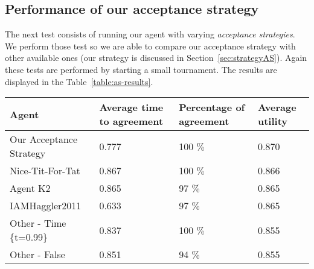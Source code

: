 \subsection{Performance of our acceptance strategy}

The next test consists of running our agent with varying \emph{acceptance strategies}. We perform those test so we are able to compare our acceptance strategy with other available ones (our strategy is discussed in Section~\ref{sec:strategyAS}). Again these tests are performed by starting a small tournament. The results are displayed in the Table~\ref{table:as-results}. 

\begin{table}[H]
	\centering
	\small
\begin{tabular}{m{4.0cm}m{3.0cm}m{3.0cm}m{3.0cm}}
  \toprule 
  Agent                         & Average time to agreement & Percentage of agreement & Average utility \\ 
  \midrule
  Our Acceptance Strategy       & 0.777                                                                 & 100 $\%$                                                             & 0.870                                                       \\ 
  Nice-Tit-For-Tat              & 0.867                                                                 & 100 $\%$                                                             & 0.866                                                       \\ 
  Agent K2                      & 0.865                                                                 & 97 $\%$                                                             & 0.865                                                       \\ 
  IAMHaggler2011                & 0.633                                                                 & 97 $\%$                                                             & 0.865                                                       \\ 
  Other - Time \{t=0.99\}       & 0.837                                                                 & 100 $\%$                                                             & 0.855                                                       \\ 
  Other - False                 & 0.851                                                                 & 94 $\%$                                                             & 0.855                                                       \\ 

\end{tabular}
\end{table}
